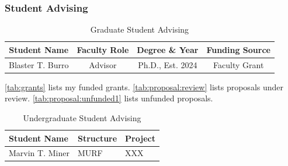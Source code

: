 \documentclass[letterpaper,12pt,times]{article}
\newcommand{\thead}[1]{\textbf{#1}}
\newcommand{\multithead}[2]{%
  \multicolumn{#1}{|c|}{\thead{#2}}%
}
\begin{document}
\subsubsection*{Student Advising}

\begin{table}[H]
  \caption{Graduate Student Advising}
  \centering
\begin{tabular}{|cccc|}
  \hline
  \thead{Student Name}
  & \thead{Faculty Role}
  & \thead{Degree \& Year}
  & \thead{Funding Source}
  \\
  \hline
  \hline
  Blaster T. Burro
  & Advisor
  & Ph.D., Est. 2024
  & Faculty Grant
  \\
  \hline
\end{tabular}
\end{table}


\autoref{tab:grants} lists my funded grants.
%
\autoref{tab:proposal:review} lists proposals under review.
%
\autoref{tab:proposal:unfunded1} lists unfunded proposals.


\begin{table}[H]
  \caption{Undergraduate Student Advising}
  \centering
\begin{tabular}{|lll|}
  \hline
  \thead{Student Name}
  & \thead{Structure}
  & \thead{Project}
  \\
  \hline
  \hline
  Marvin T. Miner
  & MURF
  & XXX
  \\
  \hline
\end{tabular}
\end{table}
\end{document}
